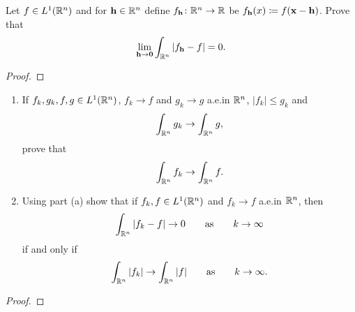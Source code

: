 \begin{problem}
Let $f\in L^1(\mathbb{R}^n)$ and for $\mathbf{h}\in\mathbb{R}^n$ define
$f_{\mathbf{h}}\colon\mathbb{R}^n\to\mathbb{R}$ be $f_{\mathbf{h}}(x)\coloneqq
f(\mathbf{x}-\mathbf{h})$. Prove that
\[
\lim_{\mathbf{h}\to\mathbf{0}}\int_{\mathbb{R}^n}\left|f_{\mathbf{h}}-f\right|=0.
\]
\end{problem}
\begin{proof}
\end{proof}

\begin{problem}
\begin{enumerate}[label=(\alph*)]
\item If $f_k,g_k,f,g\in L^1(\mathbb{R}^n)$, $f_k\to f$ and $g_k\to g$ a.e.\@ in
  $\mathbb{R}^n$, $|f_k|\leq g_k$ and
\[
\int_{\mathbb{R}^n}g_k\to\int_{\mathbb{R}^n}g,
\]
prove that
\[
\int_{\mathbb{R}^n} f_k\to\int_{\mathbb{R}^n}f.
\]
\item Using part (a) show that if $f_k,f\in L^1(\mathbb{R}^n)$ and $f_k\to f$
  a.e.\@ in $\mathbb{R}^n$, then
\[
\int_{\mathbb{R}^n}|f_k-f|\to 0\qquad\text{as}\qquad k\to\infty
\]
if and only if
\[
\int_{\mathbb{R}^n}|f_k|\to\int_{\mathbb{R}^n}|f|\qquad\text{as}\qquad k\to\infty.
\]
\end{enumerate}
\end{problem}
\begin{proof}
\end{proof}

